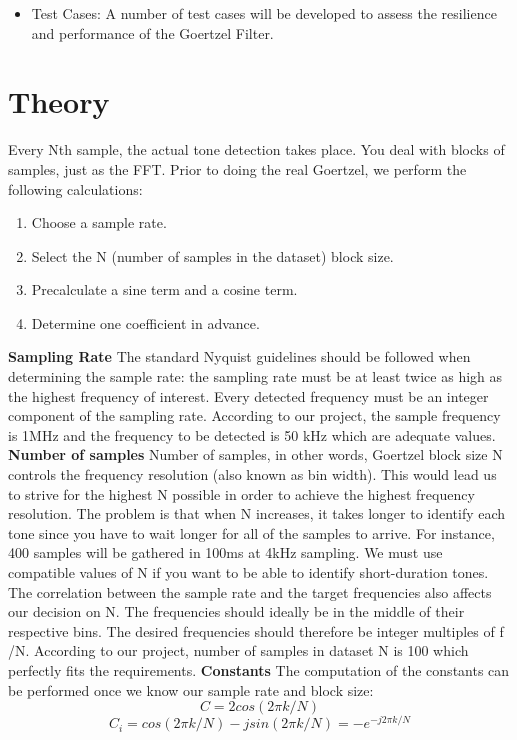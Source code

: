 \documentclass{article}
\begin{document}
\begin{itemize}
    \item Test Cases: A number of test cases will be developed to assess the resilience and performance of the Goertzel Filter.
\end{itemize}

\section{Theory}
Every Nth sample, the actual tone detection takes place. You deal with blocks of samples, just as the FFT. Prior to doing the real Goertzel, we perform the following calculations:
\begin{enumerate}
    \item Choose a sample rate.
    \item Select the N (number of samples in the dataset) block size.
    \item Precalculate a sine term and a cosine term.
    \item Determine one coefficient in advance.
\end{enumerate}

\textbf{Sampling Rate}
The standard Nyquist guidelines should be followed when determining the sample rate: the sampling rate must be at least twice as high as the highest frequency of interest. Every detected frequency must be an integer component of the sampling rate. According to our project, the sample frequency is 1MHz and the frequency to be detected is 50 kHz which are adequate values.
\textbf{Number of samples}
Number of samples, in other words, Goertzel block size N controls the frequency resolution (also known as bin width). This would lead us to strive for the highest N possible in order to achieve the highest frequency resolution. The problem is that when N increases, it takes longer to identify each tone since you have to wait longer for all of the samples to arrive. For instance, 400 samples will be gathered in 100ms at 4kHz sampling. We must use compatible values of N if you want to be able to identify short-duration tones. The correlation between the sample rate and the target frequencies also affects our decision on N. The frequencies should ideally be in the middle of their respective bins. The desired frequencies should therefore be integer multiples of f /N. According to our project, number of samples in dataset N is 100 which perfectly fits the requirements.
\textbf{Constants}
The computation of the constants can be performed once we know our sample rate and block size:
\[C=2cos⁡(2\pi k/N)\]
\[C_i=cos(2\pi k/N)-jsin(2\pi k/N)=-e^{-j2\pi k/N}\]
\end{document}
